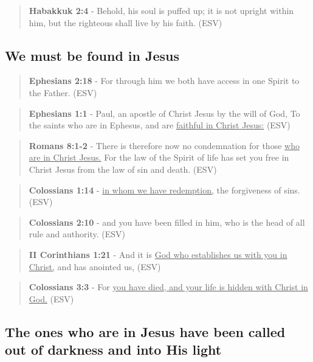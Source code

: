 \documentclass[11pt]{article}
\begin{document}
\begin{quote}
\textbf{Habakkuk 2:4} - Behold, his soul is puffed up; it is not upright within him, but the righteous shall live by his faith. (ESV)
\end{quote}

\subsection{We must be found in Jesus}
\label{sec:orgaf20056}

\begin{quote}
\textbf{Ephesians 2:18} - For through him we both have access in one Spirit to the Father. (ESV)
\end{quote}

\begin{quote}
\textbf{Ephesians 1:1} - Paul, an apostle of Christ Jesus by the will of God, To the saints who are in Ephesus, and are \uline{faithful in Christ Jesus:} (ESV)
\end{quote}

\begin{quote}
\textbf{Romans 8:1-2} - There is therefore now no condemnation for those \uline{who are in Christ Jesus.} For the law of the Spirit of life has set you free in Christ Jesus from the law of sin and death. (ESV)
\end{quote}

\begin{quote}
\textbf{Colossians 1:14} - \uline{in whom we have redemption,} the forgiveness of sins. (ESV)
\end{quote}

\begin{quote}
\textbf{Colossians 2:10} - and you have been filled in him, who is the head of all rule and authority. (ESV)
\end{quote}

\begin{quote}
\textbf{II Corinthians 1:21} - And it is \uline{God who establishes us with you in Christ,} and has anointed us, (ESV)
\end{quote}

\begin{quote}
\textbf{Colossians 3:3} - For \uline{you have died, and your life is hidden with Christ in God.} (ESV)
\end{quote}

\subsection{The ones who are in Jesus have been called out of darkness and into His light}
\label{sec:org7c8d5de}
\end{document}
